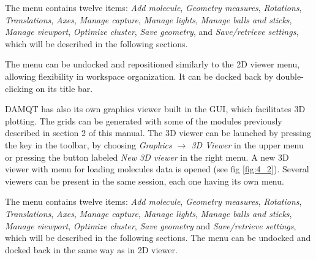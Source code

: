 \documentclass[10pt]{article}
\begin{document}
\vspace*{5mm}{\bf 3D Viewer Menu Options}\vspace*{5mm}  

The menu contains twelve items: {\it Add molecule}, {\it Geometry measures}, {\it Rotations},  
{\it Translations}, {\it Axes}, {\it Manage capture}, {\it Manage lights}, {\it Manage balls and sticks},  
{\it Manage viewport}, {\it Optimize cluster}, {\it Save geometry}, and {\it Save/retrieve settings},  
which will be described in the following sections.  

\vspace*{5mm}{\bf Menu Docking and Undocking}\vspace*{5mm}  

The menu can be undocked and repositioned similarly to the 2D viewer menu,  
allowing flexibility in workspace organization. It can be docked back by double-clicking  
on its title bar.  


DAMQT has also its own graphics viewer built in the
GUI, which facilitates 3D plotting. The grids can be generated with  some of
the modules previously described in section 2 of this manual. 
The 3D viewer can be launched by pressing the key \bigtoolbV in the toolbar, by choosing {\it 
Graphics $\rightarrow$ 3D Viewer} in the upper menu or pressing the button labeled {\it New 3D 
viewer} in the right menu.
A new 3D viewer with menu for loading molecules data is opened (see fig \ref{fig:4_2}). 
Several viewers can be present in the same session, each one having its own menu.

The menu contains twelve items: {\it Add molecule}, {\it Geometry measures}, {\it Rotations}, {\it 
Translations}, {\it Axes}, {\it Manage capture},
{\it Manage lights}, {\it Manage balls and sticks}, {\it Manage viewport},  
{\it Optimize cluster}, {\it Save geometry} and {\it Save/retrieve settings}, which will be 
described in the following sections. The menu
can be undocked and docked back in the same way as in 2D viewer.
\end{document}
